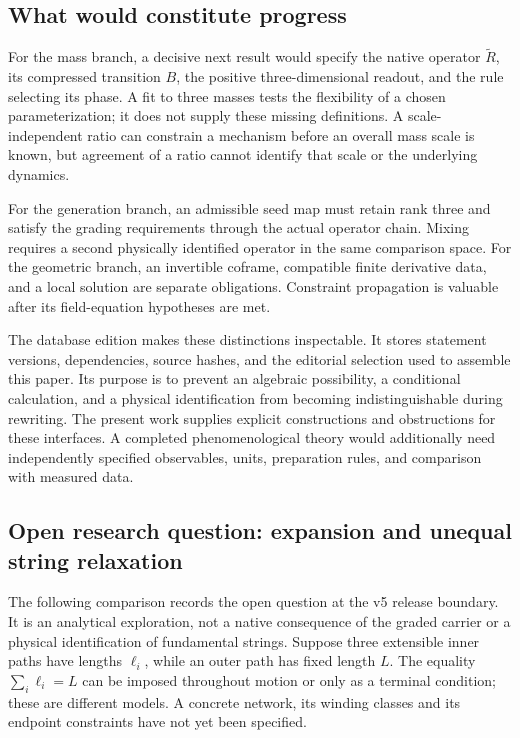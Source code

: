 \subsection{What would constitute progress}

For the mass branch, a decisive next result would specify the native
operator $\widetilde R$, its compressed transition $B$, the positive
three-dimensional readout, and the rule selecting its phase. A fit
to three masses tests the flexibility of a chosen parameterization;
it does not supply these missing definitions. A scale-independent
ratio can constrain a mechanism before an overall mass scale is
known, but agreement of a ratio cannot identify that scale or the
underlying dynamics.

For the generation branch, an admissible seed map must retain rank
three and satisfy the grading requirements through the actual
operator chain. Mixing requires a second physically identified
operator in the same comparison space. For the geometric branch,
an invertible coframe, compatible finite derivative data, and a
local solution are separate obligations. Constraint propagation is
valuable after its field-equation hypotheses are met.

The database edition makes these distinctions inspectable. It
stores statement versions, dependencies, source hashes, and the
editorial selection used to assemble this paper. Its purpose is to
prevent an algebraic possibility, a conditional calculation, and
a physical identification from becoming indistinguishable during
rewriting. The present work supplies explicit constructions and
obstructions for these interfaces. A completed phenomenological
theory would additionally need independently specified observables,
units, preparation rules, and comparison with measured data.

\subsection{Open research question: expansion and unequal string relaxation}

The following comparison records the open question at the v5 release
boundary. It is an analytical exploration, not a native consequence of
the graded carrier or a physical identification of fundamental strings.
Suppose three extensible inner paths have lengths $\ell_i$, while an
outer path has fixed length $L$. The equality $\sum_i\ell_i=L$ can be
imposed throughout motion or only as a terminal condition; these are
different models. A concrete network, its winding classes and its
endpoint constraints have not yet been specified.

